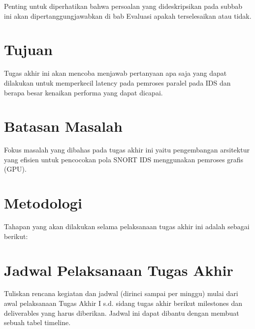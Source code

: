 Penting untuk diperhatikan bahwa persoalan yang dideskripsikan pada subbab ini akan dipertanggungjawabkan di bab Evaluasi apakah terselesaikan atau tidak.

\section{Tujuan}

Tugas akhir ini akan mencoba menjawab pertanyaan apa saja yang dapat dilakukan untuk memperkecil latency pada pemroses paralel pada IDS dan berapa besar kenaikan performa yang dapat dicapai.

\section{Batasan Masalah}

Fokus masalah yang dibahas pada tugas akhir ini yaitu pengembangan arsitektur yang efisien untuk pencocokan pola SNORT IDS menggunakan pemroses grafis (GPU).

\section{Metodologi}

Tahapan yang akan dilakukan selama pelaksanaan tugas akhir ini adalah sebagai berikut:


\section{Jadwal Pelaksanaan Tugas Akhir}

Tuliskan rencana kegiatan dan jadwal (dirinci sampai per minggu) mulai dari awal pelaksanaan Tugas Akhir I s.d. sidang tugas akhir berikut milestones dan deliverables yang harus diberikan. Jadwal ini dapat dibantu dengan membuat sebuah tabel timeline.

